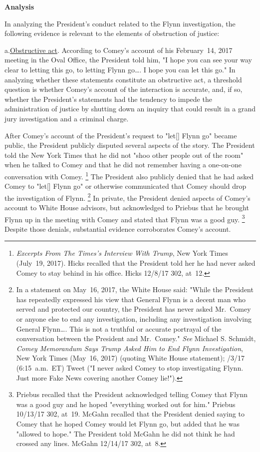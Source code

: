 \begin{center}
\textbf{Analysis}
\end{center}

In analyzing the President's conduct related to the Flynn investigation, the following evidence is relevant to the elements of obstruction of justice:

a.\qquad\underline{Obstructive act}.
According to Comey's account of his February~14, 2017 meeting in the Oval Office, the President told him, "I hope you can see your way clear to letting this go, to letting Flynn go\dots. I hope you can let this go."
In analyzing whether these statements constitute an obstructive act, a threshold question is whether Comey's account of the interaction is accurate, and, if so, whether the President's statements had the tendency to impede the administration of
justice by shutting down an inquiry that could result in a grand jury investigation and a criminal charge.

After Comey's account of the President's request to "let[] Flynn go" became public, the President publicly disputed several aspects of the story.
The President told the New York Times that he did not "shoo other people out of the room" when he talked to Comey and that he did not remember having a one-on-one conversation with Comey.%
\footnote{\textit{Excerpts From The Times's Interview With Trump}, New York Times (July~19, 2017).
Hicks recalled that the President told her he had never asked Comey to stay behind in his office.
Hicks 12/8/17 302, at~12.}
The President also publicly denied that he had asked Comey to "let[] Flynn go" or otherwise communicated that Comey should drop the investigation of Flynn.%
\footnote{In a statement on May~16, 2017, the White House said:
"While the President has repeatedly expressed his view that General Flynn is a decent man who served and protected our country, the President has never asked Mr.~Comey or anyone else to end any investigation, including any investigation involving General Flynn\dots.
This is not a truthful or accurate portrayal of the conversation between the President and Mr.~Comey."
\textit{See} Michael S. Schmidt, \textit{Comey Memorandum Says Trump Asked Him to End Flynn Investigation}, New York Times (May~16, 2017) (quoting White House statement);
/3/17 (6:15~a.m.~ET) Tweet ("I never asked Comey to stop investigating Flynn.
Just more Fake News covering another Comey lie!").}
In private, the President denied aspects of Comey's account to White House advisors, but acknowledged to Priebus that he brought Flynn up in the meeting with Comey and stated that Flynn was a good guy.%
\footnote{Priebus recalled that the President acknowledged telling Comey that Flynn was a good guy and he hoped "everything worked out for him."
Priebus 10/13/17 302, at~19.
McGahn recalled that the President denied saying to Comey that he hoped Comey would let Flynn go, but added that he was "allowed to hope."
The President told McGahn he did not think he had crossed any lines.
McGahn 12/14/17 302, at~8.}
Despite those denials, substantial evidence corroborates Comey's account.

